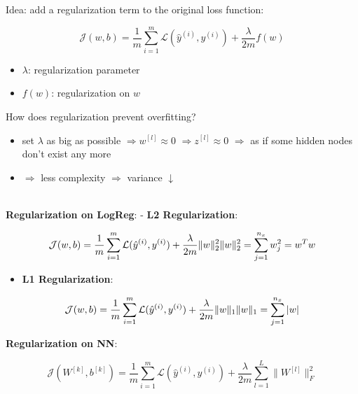 \documentclass[
]{book}
\providecommand{\tightlist}{%
  \setlength{\itemsep}{0pt}\setlength{\parskip}{0pt}}
\begin{document}
Idea: add a regularization term to the original loss function:

\[\begin{equation}
\mathcal{J}(w,b)=\frac{1}{m}\sum_{i=1}^{m}{\mathcal{L}(\hat{y}^{(i)},y^{(i)})}+\frac{\lambda}{2m}f(w)
\end{equation}\]

\begin{itemize}
\tightlist
\item
  \(\lambda\): regularization parameter
\item
  \(f(w)\): regularization on \(w\)
\end{itemize}

How does regularization prevent overfitting?

\begin{itemize}
\tightlist
\item
  set \(\lambda\) as big as possible \(\Rightarrow w^{[l]}\approx 0\)
  \(\Rightarrow z^{[l]}\approx 0\) \(\Rightarrow\) as if some hidden
  nodes don't exist any more
\item
  \(\Rightarrow\) less complexity \(\Rightarrow\) variance
  \(\downarrow\)
\end{itemize}

~\\
\textbf{Regularization on LogReg}: - \textbf{L2 Regularization}:

\[\begin{equation}
\mathcal{J}(w,b)=\frac{1}{m}\sum_{i=1}^{m}{\mathcal{L}(\hat{y}^{(i)},y^{(i)})}+\frac{\lambda}{2m}\|w\|^2_2 \\
\|w\|^2_2=\sum_{j=1}^{n_x}w_j^2=w^Tw
\end{equation}\]

\begin{itemize}
\tightlist
\item
  \textbf{L1 Regularization}:
\end{itemize}

\[\begin{equation}
\mathcal{J}(w,b)=\frac{1}{m}\sum_{i=1}^{m}{\mathcal{L}(\hat{y}^{(i)},y^{(i)})}+\frac{\lambda}{2m}\|w\|_1 \\
\|w\|_1=\sum_{j=1}^{n_x}{|w|}
\end{equation}\]

\textbf{Regularization on NN}:

\[\begin{equation}
\mathcal{J}(W^{[k]},b^{[k]})=\frac{1}{m}\sum_{i=1}^{m}{\mathcal{L}(\hat{y}^{(i)},y^{(i)})}+\frac{\lambda}{2m}\sum_{l=1}^L{\|W^{[l]}\|^2_F}
\end{equation}\]
\end{document}
